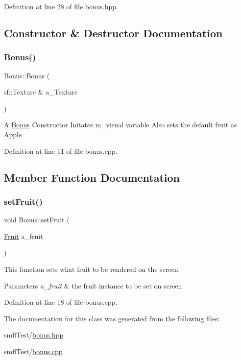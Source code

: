 Definition at line 28 of file bonus.\+hpp.



\subsection{Constructor \& Destructor Documentation}
\mbox{\label{class_bonus_a46346c2f358e8671fc3d4a3c7fae87de}} 
\subsubsection{\texorpdfstring{Bonus()}{Bonus()}}
{\footnotesize\ttfamily Bonus\+::\+Bonus (\begin{DoxyParamCaption}\item[{sf\+::\+Texture \&}]{a\+\_\+\+Texture }\end{DoxyParamCaption})}

A \hyperlink{class_bonus}{Bonus} Constructor Initates m\+\_\+visual variable Also sets the default fruit as Apple 

Definition at line 11 of file bonus.\+cpp.



\subsection{Member Function Documentation}
\mbox{\label{class_bonus_ad6b1650c30b01857ef003a6e9ebf4265}} 
\subsubsection{\texorpdfstring{set\+Fruit()}{setFruit()}}
{\footnotesize\ttfamily void Bonus\+::set\+Fruit (\begin{DoxyParamCaption}\item[{\hyperlink{class_bonus_a4325b797efccdaec4e373ceabbfc997f}{Fruit}}]{a\+\_\+fruit }\end{DoxyParamCaption})}

This function sets what fruit to be rendered on the screen


\begin{DoxyParams}{Parameters}
{\em a\+\_\+fruit} & the fruit instance to be set on screen \\
\hline
\end{DoxyParams}


Definition at line 18 of file bonus.\+cpp.



The documentation for this class was generated from the following files\+:\begin{DoxyCompactItemize}
\item 
smfl\+Test/\hyperlink{bonus_8hpp}{bonus.\+hpp}\item 
smfl\+Test/\hyperlink{bonus_8cpp}{bonus.\+cpp}\end{DoxyCompactItemize}
